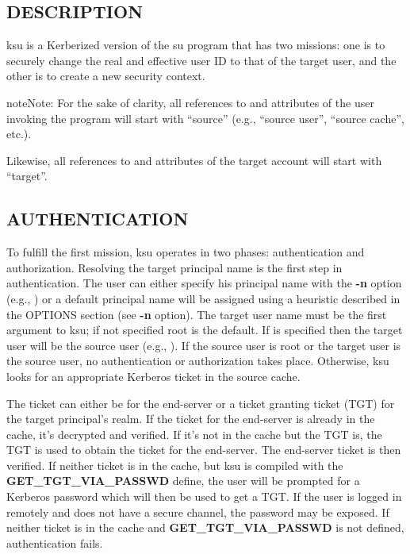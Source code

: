 \documentclass[letterpaper,10pt,english]{sphinxmanual}
\begin{document}
\subsection{DESCRIPTION}
\label{user/user_commands/ksu:description}
ksu is a Kerberized version of the su program that has two missions:
one is to securely change the real and effective user ID to that of
the target user, and the other is to create a new security context.

\begin{notice}{note}{Note:}
For the sake of clarity, all references to and attributes of
the user invoking the program will start with ``source''
(e.g., ``source user'', ``source cache'', etc.).

Likewise, all references to and attributes of the target
account will start with ``target''.
\end{notice}


\subsection{AUTHENTICATION}
\label{user/user_commands/ksu:authentication}
To fulfill the first mission, ksu operates in two phases:
authentication and authorization.  Resolving the target principal name
is the first step in authentication.  The user can either specify his
principal name with the \textbf{-n} option (e.g., )
or a default principal name will be assigned using a heuristic
described in the OPTIONS section (see \textbf{-n} option).  The target user
name must be the first argument to ksu; if not specified root is the
default.  If  is specified then the target user will be the
source user (e.g., ).  If the source user is root or the
target user is the source user, no authentication or authorization
takes place.  Otherwise, ksu looks for an appropriate Kerberos ticket
in the source cache.

The ticket can either be for the end-server or a ticket granting
ticket (TGT) for the target principal's realm.  If the ticket for the
end-server is already in the cache, it's decrypted and verified.  If
it's not in the cache but the TGT is, the TGT is used to obtain the
ticket for the end-server.  The end-server ticket is then verified.
If neither ticket is in the cache, but ksu is compiled with the
\textbf{GET\_TGT\_VIA\_PASSWD} define, the user will be prompted for a
Kerberos password which will then be used to get a TGT.  If the user
is logged in remotely and does not have a secure channel, the password
may be exposed.  If neither ticket is in the cache and
\textbf{GET\_TGT\_VIA\_PASSWD} is not defined, authentication fails.
\end{document}
